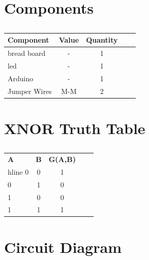 \documentclass[10pt, a4paper]{article}
\title{\mytitle}
\author{\myauthor\hspace{1em}\\\contact\\IITH\hspace{0.5em}-\hspace{0.5em}\mymodule}
\date{}
\begin{document}
 \maketitle

 \begin{abstract}
  We can able to design all other gates using the pair Universal gates i.e;(NAND and NOR).This document is to understand the behavior and demonstrate the Implementation of XNOR Gate using NOR gate.
 \end{abstract}
    
\section{Components}
\begin{table}[htbp]
 \begin{center}
    \begin{tabular}{|l|c|c|c|c|} \hline
  \textbf{Component}& \textbf{Value} & \textbf{Quantity} \\
 \hline
 bread board& - & 1 \\ \hline
led &  - & 1 \\ \hline
Arduino & - & 1 \\ \hline
Jumper Wires & M-M & 2  \\ \hline
\end{tabular}  
\end{center}
\caption{\label{table:dummytable} }
\end{table}



\section{XNOR Truth Table}
\begin{table}[htbp]
 \begin{center}
    \begin{tabular}{|l|c|c|c|c|} \hline
  \textbf{A}& \textbf{B} & \textbf{G(A,B)} \\hline
0&0&1\\ \hline
0&1&0 \\ \hline
1&0&0\\ \hline
1&1&1\\ \hline
\end{tabular}  
\end{center}
\caption{\label{table:dummytable} }
\end{table}

\section{Circuit Diagram}
\end{document}

